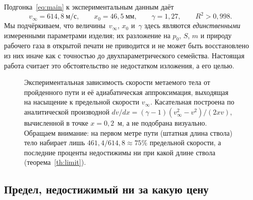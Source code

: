 \documentclass[11pt,a4paper]{article}
\begin{document}
Подгонка~\eqref{eq:main} к экспериментальным данным даёт
\[
v_\infty=614{,}8~\text{м/с},\qquad x_0=46{,}5~\text{мм},\qquad \gamma=1{,}27,\qquad R^2>0{,}998 .
\]
Мы подчёркиваем, что величины~$v_\infty$, $x_0$ и~$\gamma$ здесь являются \emph{единственными} измеренными параметрами изделия; их разложение на $p_0$, $S$, $m$ и природу рабочего газа в открытой печати не приводится и не может быть восстановлено из них иначе как с точностью до двухпараметрического семейства. Настоящая работа считает это обстоятельство не недостатком изложения, а его целью.

\begin{figure}[h!]
\centering
{}
\caption{Экспериментальная зависимость скорости метаемого тела от пройденного пути и её адиабатическая аппроксимация, выходящая на насыщение к предельной скорости $v_\infty$. Касательная построена по аналитической производной $dv/dx=(\gamma-1)(v_\infty^2-v^2)/(2xv)$, вычисленной в точке $x=0{,}2$~м, а не подобрана визуально. Обращаем внимание: на первом метре пути (штатная длина ствола) тело набирает лишь $461{,}4/614{,}8\approx75\%$ предельной скорости, а последние проценты недостижимы ни при какой длине ствола (теорема~\ref{th:limit}).}
\label{fig:vx}
\end{figure}

\subsection{Предел, недостижимый ни за какую цену}
\end{document}
